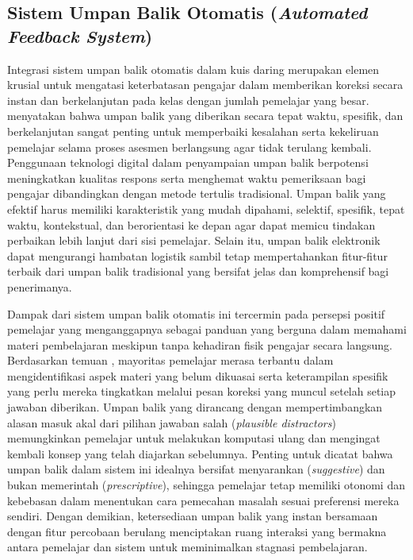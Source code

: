 \subsection{Sistem Umpan Balik Otomatis (\textit{Automated Feedback System})}
\label{ssec:sistem_umpan_balik_otomatis}

Integrasi sistem umpan balik otomatis dalam kuis daring merupakan elemen krusial untuk mengatasi keterbatasan pengajar dalam memberikan koreksi secara instan dan berkelanjutan pada kelas dengan jumlah pemelajar yang besar. \textcite{Mendoza2022} menyatakan bahwa umpan balik yang diberikan secara tepat waktu, spesifik, dan berkelanjutan sangat penting untuk memperbaiki kesalahan serta kekeliruan pemelajar selama proses asesmen berlangsung agar tidak terulang kembali. Penggunaan teknologi digital dalam penyampaian umpan balik berpotensi meningkatkan kualitas respons serta menghemat waktu pemeriksaan bagi pengajar dibandingkan dengan metode tertulis tradisional. Umpan balik yang efektif harus memiliki karakteristik yang mudah dipahami, selektif, spesifik, tepat waktu, kontekstual, dan berorientasi ke depan agar dapat memicu tindakan perbaikan lebih lanjut dari sisi pemelajar. Selain itu, umpan balik elektronik dapat mengurangi hambatan logistik sambil tetap mempertahankan fitur-fitur terbaik dari umpan balik tradisional yang bersifat jelas dan komprehensif bagi penerimanya.

Dampak dari sistem umpan balik otomatis ini tercermin pada persepsi positif pemelajar yang menganggapnya sebagai panduan yang berguna dalam memahami materi pembelajaran meskipun tanpa kehadiran fisik pengajar secara langsung. Berdasarkan temuan \textcite{Mendoza2022}, mayoritas pemelajar merasa terbantu dalam mengidentifikasi aspek materi yang belum dikuasai serta keterampilan spesifik yang perlu mereka tingkatkan melalui pesan koreksi yang muncul setelah setiap jawaban diberikan. Umpan balik yang dirancang dengan mempertimbangkan alasan masuk akal dari pilihan jawaban salah (\textit{plausible distractors}) memungkinkan pemelajar untuk melakukan komputasi ulang dan mengingat kembali konsep yang telah diajarkan sebelumnya. Penting untuk dicatat bahwa umpan balik dalam sistem ini idealnya bersifat menyarankan (\textit{suggestive}) dan bukan memerintah (\textit{prescriptive}), sehingga pemelajar tetap memiliki otonomi dan kebebasan dalam menentukan cara pemecahan masalah sesuai preferensi mereka sendiri. Dengan demikian, ketersediaan umpan balik yang instan bersamaan dengan fitur percobaan berulang menciptakan ruang interaksi yang bermakna antara pemelajar dan sistem untuk meminimalkan stagnasi pembelajaran.

